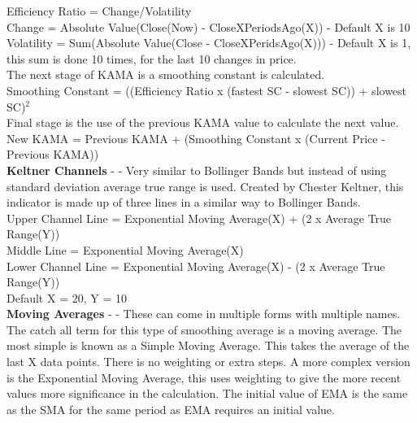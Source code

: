 \documentclass[conference]{IEEEtran}
\begin{document}
\noindent
Efficiency Ratio = Change/Volatility\\
Change = Absolute Value(Close(Now) - CloseXPeriodsAgo(X)) - Default X is 10 \\
Volatility = Sum(Absolute Value(Close - CloseXPeridsAgo(X))) - Default X is 1, this sum is done 10 times, for the last 10 changes in price.\\

\noindent
The next stage of KAMA is a smoothing constant is calculated. \\

\noindent
Smoothing Constant = ((Efficiency Ratio x (fastest SC - slowest SC)) + slowest SC)$^2$\\

\noindent
Final stage is the use of the previous KAMA value to calculate the next value. \\

\noindent
New KAMA = Previous KAMA + (Smoothing Constant x (Current Price - Previous KAMA))\\

\iffalse
[]
\fi

\noindent
\textbf{Keltner Channels} - \cite{Keltner1960} - Very similar to Bollinger Bands but instead of using standard deviation average true range is used. Created by Chester Keltner, this indicator is made up of three lines in a similar way to Bollinger Bands.\\

\noindent
Upper Channel Line = Exponential Moving Average(X) + (2 x Average True Range(Y))\\
Middle Line = Exponential Moving Average(X)\\
Lower Channel Line = Exponential Moving Average(X) - (2 x Average True Range(Y))\\ Default X = 20, Y = 10 \\

\iffalse
[]
\fi

\noindent
\textbf{Moving Averages} - \cite{Murphy1999} - These can come in multiple forms with multiple names. The catch all term for this type of smoothing average is a moving average. The most simple is known as a Simple Moving Average. This takes the average of the last X data points. There is no weighting or extra steps. A more complex version is the Exponential Moving Average, this uses weighting to give the more recent values more significance in the calculation. The initial value of EMA is the same as the SMA for the same period as EMA requires an initial value.\\
\end{document}
